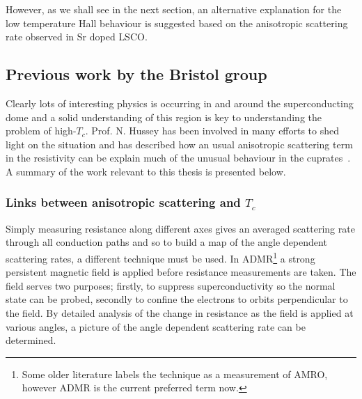 However, as we shall see in the next section, an alternative explanation for the low temperature Hall behaviour is suggested based on the anisotropic scattering rate observed in Sr doped \acf{LSCO}.





\subsection{Previous work by the Bristol group}

Clearly lots of interesting physics is occurring in and around the superconducting dome and a solid understanding of this region is key to understanding the problem of high-$T_c$. Prof. N. Hussey has been involved in many efforts to shed light on the situation and has described how an usual anisotropic scattering term in the resistivity can be explain much of the unusual behaviour in the cuprates~\cite{Hussey2003b, Hussey2011a, Hussey2008}. A summary of the work relevant to this thesis is presented below.

\subsubsection{Links between anisotropic scattering and $T_c$}
    \label{Sec:Intro:AnisotropicScattering}

Simply measuring resistance along different axes gives an averaged scattering rate through all conduction paths and so to build a map of the angle dependent scattering rates, a different technique must be used. In \ac{ADMR}\footnote{Some older literature labels the technique as a measurement of \ac{AMRO}, however \ac{ADMR} is the current preferred term now.} a strong persistent magnetic field is applied before resistance measurements are taken. The field serves two purposes; firstly, to suppress superconductivity so the normal state can be probed, secondly to confine the electrons to orbits perpendicular to the field. By detailed analysis of the change in resistance as the field is applied at various angles, a picture of the angle dependent scattering rate can be determined.

